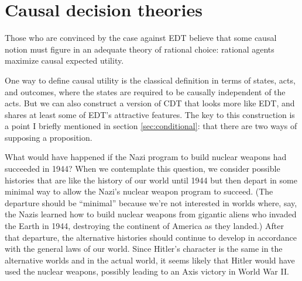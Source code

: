 
\section{Causal decision theories}

Those who are convinced by the case against EDT believe that some
causal notion must figure in an adequate theory of rational choice:
rational agents maximize causal expected utility.

One way to define causal utility is the classical definition in terms of states,
acts, and outcomes, where the states are required to be causally independent of
the acts. But we can also construct a version of CDT that looks more like EDT,
and shares at least some of EDT's attractive features. The key to this
construction is a point I briefly mentioned in section \ref{sec:conditional}:
that there are two ways of supposing a proposition.

What would have happened if the Nazi program to build nuclear weapons
had succeeded in 1944? When we contemplate this question, we consider
possible histories that are like the history of our world until 1944
but then depart in some minimal way to allow the Nazi's nuclear
weapon program to succeed. (The departure should be ``minimal''
because we're not interested in worlds where, say, the Nazis learned
how to build nuclear weapons from gigantic aliens who invaded the
Earth in 1944, destroying the continent of America as they landed.)
After that departure, the alternative histories should continue to
develop in accordance with the general laws of our world. Since
Hitler's character is the same in the alternative worlds and in the
actual world, it seems likely that Hitler would have used the nuclear
weapons, possibly leading to an Axis victory in World War II.

